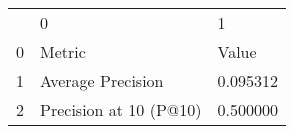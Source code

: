 \begin{tabular}{lll}
 & 0 & 1 \\
0 & Metric & Value \\
1 & Average Precision & 0.095312 \\
2 & Precision at 10 (P@10) & 0.500000 \\
\end{tabular}
